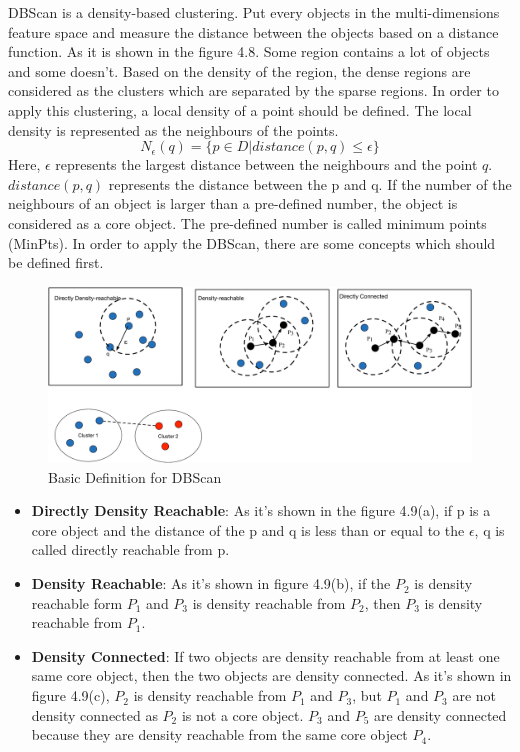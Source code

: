 DBScan is a density-based clustering.  Put every objects in the multi-dimensions feature space and measure the distance between the objects based on a distance function. As it is shown in the figure 4.8. Some region contains a lot of objects and some doesn't. Based on the density of the region, the dense regions are considered as the clusters which are separated by the sparse regions. In order to apply this clustering, a local density of a point should be defined. The local density is represented as the neighbours of the points.
\begin{equation}
N_\epsilon(q)=\{p \in D| distance(p,q) \le \epsilon\}
\end{equation}
Here, $\epsilon$ represents the largest distance between the neighbours and the point $q$. $distance(p,q)$ represents the distance between the p and q. If the number of the neighbours of an object is larger than a pre-defined number, the object is  considered as a core object. The pre-defined number is called minimum points (MinPts).  In order to apply the DBScan, there are some concepts which should be defined first.
\begin{figure}
\centering
\includegraphics[scale=0.4]{DBScanPre.pdf}
\caption{Basic Definition for DBScan}
\end{figure}
\begin{itemize}
\item \textbf{Directly Density Reachable}:  As it's shown in the figure 4.9(a), if p is a core object and the distance of the p and q is less than or equal to the $\epsilon$, q is called directly reachable from p.  
\item \textbf{Density Reachable}: As it's shown in figure 4.9(b), if the $P_2$ is density reachable form $P_1$ and $P_3$ is density reachable from $P_2$, then $P_3$ is density reachable from $P_1$.  
\item \textbf{Density Connected}: If two objects are density reachable from at least one same core object, then the two objects are density connected. As it's shown in figure 4.9(c), $P_2$ is density reachable from $P_1$ and $P_3$, but $P_1$ and $P_3$ are not density connected as $P_2$ is not a core object. $P_3$ and $P_5$ are density connected because they are density reachable from the same core object $P_4$.
\end{itemize}

